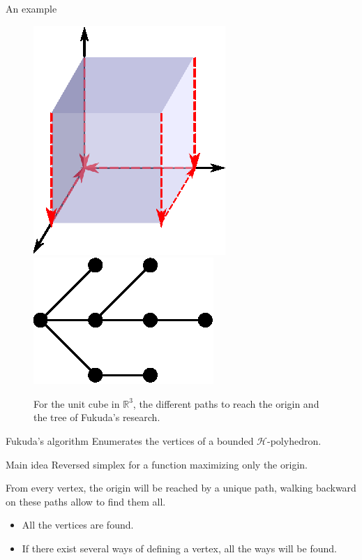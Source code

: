\begin{frame}{An example}
\begin{figure}
\includegraphics[width=0.35\columnwidth]{images/fukuda.eps}
\includegraphics[width=0.35\columnwidth]{images/fukugraph.eps}

For the unit cube in $\mathbb{R}^3$, the different paths to reach the origin and the tree of Fukuda's research.
\end{figure}
\end{frame}



\begin{frame}{Fukuda's algorithm}
Enumerates the vertices of a bounded $\mathcal{H}$-polyhedron. 

\begin{block}{Main idea}
Reversed simplex for a function maximizing only the origin.

From every vertex, the origin will be reached by a unique path, walking backward on these paths allow to find them all.
\end{block}

\begin{itemize}
\item All the vertices are found.
\item If there exist several ways of defining a vertex, all the ways will be found.
\end{itemize}
\end{frame}



